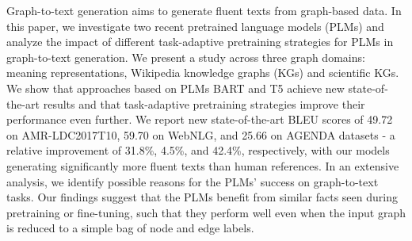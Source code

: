 Graph-to-text generation aims to generate fluent texts from graph-based data. In this paper, we investigate two recent pretrained language models (PLMs) and analyze the impact of different task-adaptive pretraining strategies for PLMs in graph-to-text generation. We present a study across three graph domains: meaning representations, Wikipedia knowledge graphs (KGs) and scientific KGs. We show that approaches based on PLMs BART and T5 achieve new state-of-the-art results and that task-adaptive pretraining strategies improve their performance even further. We report new state-of-the-art BLEU scores of 49.72 on AMR-LDC2017T10, 59.70 on WebNLG, and 25.66 on AGENDA datasets - a relative improvement of 31.8\%, 4.5\%, and 42.4\%, respectively, with our models generating significantly more fluent texts than human references.  In an extensive analysis, we identify possible reasons for the PLMs' success on graph-to-text tasks. Our findings suggest that the PLMs benefit from similar facts seen during pretraining or fine-tuning, such that they perform well even when the input graph is reduced to a simple bag of node and edge labels.

